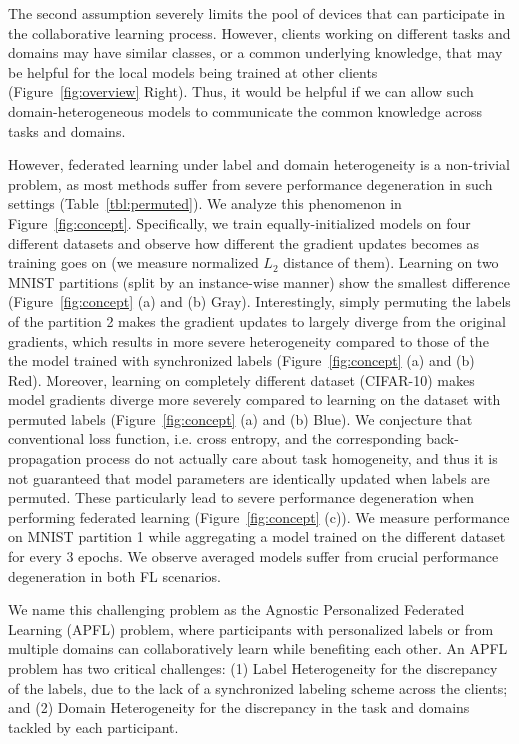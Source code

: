 The second assumption severely limits the pool of devices that can participate in the collaborative learning process. However, clients working on different tasks and domains may have similar classes, or a common underlying knowledge, that may be helpful for the local models being trained at other clients (Figure~\ref{fig:overview} Right). Thus, it would be helpful if we can allow such domain-heterogeneous models to communicate the common knowledge across tasks and domains. 

However, federated learning under label and domain heterogeneity is a non-trivial problem, as most methods suffer from severe performance degeneration in such settings (Table~\ref{tbl:permuted}). We analyze this phenomenon in Figure~\ref{fig:concept}. Specifically, we train equally-initialized models on four different datasets and observe how different the gradient updates becomes as training goes on (we measure normalized $L_2$ distance of them). Learning on two MNIST partitions (split by an instance-wise manner) show the smallest difference (Figure~\ref{fig:concept} (a) and (b) Gray). Interestingly, simply permuting the labels of the partition 2 makes the gradient updates to largely diverge from the original gradients, which results in more severe heterogeneity compared to those of the the model trained with synchronized labels (Figure~\ref{fig:concept} (a) and (b) Red). Moreover, learning on completely different dataset (CIFAR-10) makes model gradients diverge more severely compared to learning on the dataset with permuted labels (Figure~\ref{fig:concept} (a) and (b) Blue). We conjecture that conventional loss function, i.e. cross entropy, and the corresponding back-propagation process do not actually care about task homogeneity, and thus it is not guaranteed that model parameters are identically updated when labels are permuted. These particularly lead to severe performance degeneration when performing federated learning (Figure~\ref{fig:concept} (c)). We measure performance on MNIST partition 1 while aggregating a model trained on the different dataset for every 3 epochs. We observe averaged models suffer from crucial performance degeneration in both  FL scenarios.


We name this challenging problem as the Agnostic Personalized Federated Learning (APFL) problem, where participants with personalized labels or from multiple domains can collaboratively learn while benefiting each other. An APFL problem has two critical challenges: (1) Label Heterogeneity for the discrepancy of the labels, due to the lack of a synchronized labeling scheme across the clients; and (2) Domain Heterogeneity for the discrepancy in the task and domains tackled by each participant. 

